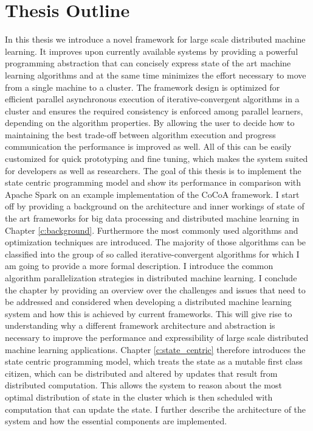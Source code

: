 \section{Thesis Outline}
In this thesis we introduce a novel framework for large scale distributed machine learning.
It improves upon currently available systems by providing a powerful programming abstraction that can concisely express state of the art machine learning algorithms and at the same time minimizes the effort necessary to move from a single machine to a cluster.
The framework design is optimized for efficient parallel asynchronous execution of iterative-convergent algorithms in a cluster and ensures the required consistency is enforced among parallel learners, depending on the algorithm properties. By allowing the user to decide how to maintaining the best trade-off between algorithm execution and progress communication the performance is improved as well.
All of this can be easily customized for quick prototyping and fine tuning, which makes the system suited for developers as well as researchers.
The goal of this thesis is to implement the state centric programming model and show its performance in comparison with Apache Spark on an example implementation of the CoCoA \cite{Jaggi2014} framework.
I start off by providing a background on the architecture and inner workings of state of the art frameworks for big data processing and distributed machine learning in Chapter \ref{c:background}. Furthermore the most commonly used algorithms and optimization techniques are introduced.
The majority of those algorithms can be classified into the group of so called iterative-convergent algorithms for which I am going to provide a more formal description. I introduce the common algorithm parallelization strategies in distributed machine learning.
I conclude the chapter by providing an overview over the challenges and issues that need to be addressed and considered when developing a distributed machine learning system and how this is achieved by current frameworks.
This will give rise to understanding why a different framework architecture and abstraction is necessary to improve the performance and expressibility of large scale distributed machine learning applications.
Chapter \ref{c:state_centric} therefore introduces the state centric programming model, which treats the state as a mutable first class citizen, which can be distributed and altered by updates that result from distributed computation.
This allows the system to reason about the most optimal distribution of state in the cluster which is then scheduled with computation that can update the state. I further describe the architecture of the system and how the essential components are implemented.
